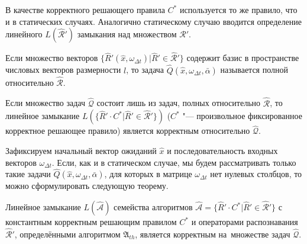 В качестве корректного решающего правила $C^*$ используется то же правило, что и в статических случаях. Аналогично статическому случаю вводится определение линейного $L(\hat{\mathcal R}')$ замыкания над множеством $\hat{\mathcal R}'$. 

\begin{Def}
	Если множество векторов $\{\hat R'(\hat x,\omega_{\Delta t})|\hat R'\in\hat{\mathcal R}'\}$ содержит базис в пространстве числовых векторов размерности $l$, то задача $\hat Q(\hat x,\omega_{\Delta t},\bar{\alpha})$ называется полной относительно $\hat{\mathcal R}$.
\end{Def}

\begin{Pred}
	\label{pred:correctness_d}
	Если множество задач $\hat{\mathcal Q}$ состоит лишь из задач, полных относительно $\hat{\mathcal R}$, то линейное замыкание $L(\{\hat R'{\cdot}C^*|\hat R'\in\hat{\mathcal R}'\})$ ($C^*$ "--- произвольное фиксированное корректное решающее правило) является корректным относительно $\hat{\mathcal Q}$.
\end{Pred}

Зафиксируем начальный вектор ожиданий $\hat{x}$ и последовательность входных векторов $\omega_{\Delta{t}}$. Если, как и в статическом случае, мы будем рассматривать только такие задачи $\hat{Q}(\hat{x},\omega_{\Delta{t}},\bar{\alpha})$, для которых в матрице $\omega_{\Delta{t}}$ нет нулевых столбцов, то можно сформулировать следующую теорему.

\begin{Theorem}\label{th:correctness_d}
	Линейное замыкание $L(\hat{\mathcal A})$ семейства алгоритмов $\hat{\mathcal A}=\{\hat R'{\cdot}C^*|\hat R'\in\hat{\mathcal R}'\}$ с константным корректным решающим правилом $C^*$ и операторами распознавания $\hat{\mathcal R}'$, определёнными алгоритмом $\mathfrak{A}_{th}$, является корректным на~множестве задач $\hat{\mathcal Q}$.
\end{Theorem}

